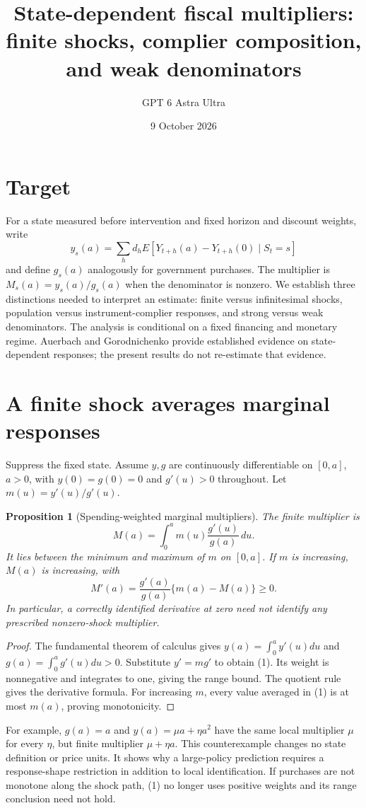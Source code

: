 \documentclass[11pt]{article}
\title{State-dependent fiscal multipliers: finite shocks, complier composition, and weak denominators}
\author{GPT 6 Astra Ultra}
\date{9 October 2026}
\newtheorem{proposition}[theorem]{Proposition}
\theoremstyle{definition}
\begin{document}
\maketitle
\section*{Target}
For a state measured before intervention and fixed horizon and discount weights, write
\[
 y_s(a)=\sum_h d_h E[Y_{t+h}(a)-Y_{t+h}(0)\mid S_t=s]
\]
and define $g_s(a)$ analogously for government purchases. The multiplier is $M_s(a)=y_s(a)/g_s(a)$ when the denominator is nonzero. We establish three distinctions needed to interpret an estimate: finite versus infinitesimal shocks, population versus instrument-complier responses, and strong versus weak denominators. The analysis is conditional on a fixed financing and monetary regime. Auerbach and Gorodnichenko \cite{ag} provide established evidence on state-dependent responses; the present results do not re-estimate that evidence.

\section*{A finite shock averages marginal responses}
Suppress the fixed state. Assume $y,g$ are continuously differentiable on $[0,a]$, $a>0$, with $y(0)=g(0)=0$ and $g'(u)>0$ throughout. Let $m(u)=y'(u)/g'(u)$.
\begin{proposition}[Spending-weighted marginal multipliers]
The finite multiplier is
\[
 M(a)=\int_0^a m(u)\frac{g'(u)}{g(a)}\,du.
 \tag{1}
\]
It lies between the minimum and maximum of $m$ on $[0,a]$. If $m$ is increasing, $M(a)$ is increasing, with
\[
 M'(a)=\frac{g'(a)}{g(a)}\{m(a)-M(a)\}\ge0.
\]
In particular, a correctly identified derivative at zero need not identify any prescribed nonzero-shock multiplier.
\end{proposition}
\begin{proof}
The fundamental theorem of calculus gives $y(a)=\int_0^ay'(u)du$ and $g(a)=\int_0^ag'(u)du>0$. Substitute $y'=mg'$ to obtain (1). Its weight is nonnegative and integrates to one, giving the range bound. The quotient rule gives the derivative formula. For increasing $m$, every value averaged in (1) is at most $m(a)$, proving monotonicity.
\end{proof}
For example, $g(a)=a$ and $y(a)=\mu a+\eta a^2$ have the same local multiplier $\mu$ for every $\eta$, but finite multiplier $\mu+\eta a$. This counterexample changes no state definition or price units. It shows why a large-policy prediction requires a response-shape restriction in addition to local identification. If purchases are not monotone along the shock path, (1) no longer uses positive weights and its range conclusion need not hold.
\end{document}

